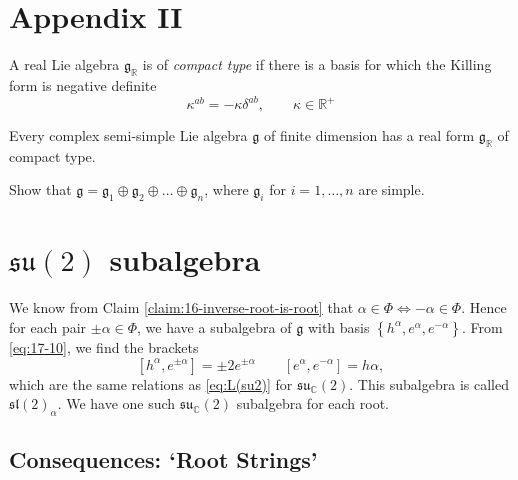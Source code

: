 \section*{Appendix II}%

\begin{definition}[]
  A real Lie algebra $\mathfrak{g}_{\mathbb{R}}$ is of \emph{compact type} if there is a basis for which the Killing form is negative definite
  \begin{equation}
    \kappa^{ab} = -\kappa \delta^{ab}, \qquad \kappa \in \mathbb{R}^+
  \end{equation}
\end{definition}

\begin{theorem}[]
  Every complex semi-simple Lie algebra $\mathfrak{g}$ of finite dimension has a real form $\mathfrak{g}_{\mathbb{R}}$ of compact type.
\end{theorem}

\begin{exercise}
  Show that $\mathfrak{g} = \mathfrak{g}_1 \oplus \mathfrak{g}_2 \oplus \dots \oplus \mathfrak{g}_n$, where $\mathfrak{g}_i$ for $i = 1, \dots, n$ are simple.
\end{exercise}


\section{\texorpdfstring{$\mathfrak{su}(2)$}{Lie algebra of SU(2)} subalgebra}%
\label{sec:lie_algebra_of_su_2_subalgebra}

We know from Claim \ref{claim:16-inverse-root-is-root} that $\alpha \in \Phi \iff -\alpha \in \Phi$. Hence for each pair $\pm \alpha \in \Phi$, we have a subalgebra of $\mathfrak{g}$ with basis $\left\{ h^{\alpha}, e^{\alpha}, e^{-\alpha} \right\}$. From \eqref{eq:17-10}, we find the brackets
\begin{equation}
  \label{eq:17-11}
  [h^{\alpha}, e^{\pm \alpha}] = \pm 2 e^{\pm \alpha} \qquad [e^{\alpha}, e^{-\alpha}] = h\alpha,
\end{equation}
which are the same relations as \eqref{eq:L(su2)} for $\mathfrak{su}_{\mathbb{C}}(2)$.
This subalgebra is called $\mathfrak{sl}(2)_{\alpha}$. We have one such $\mathfrak{su}_{\mathbb{C}}(2)$ subalgebra for each root.

\subsection{Consequences: `Root Strings'}%

